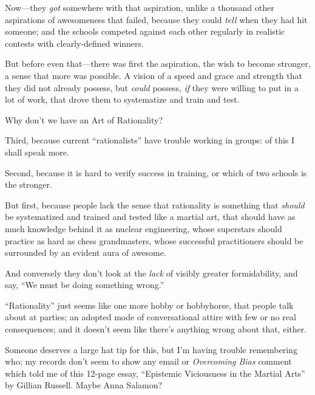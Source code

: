 {
 Now---they \textit{got} somewhere with that aspiration, unlike a
thousand other aspirations of awesomeness that failed, because they
could \textit{tell} when they had hit someone; and the schools competed
against each other regularly in realistic contests with clearly-defined
winners.}

{
 But before even that---there was first the aspiration, the wish to
become stronger, a sense that more was possible. A vision of a speed
and grace and strength that they did not already possess, but
\textit{could} possess, \textit{if} they were willing to put in a lot
of work, that drove them to systematize and train and test.}

{
 Why don't we have an Art of Rationality?}

{
 Third, because current
``rationalists'' have trouble
working in groups: of this I shall speak more.}

{
 Second, because it is hard to verify success in training, or which
of two schools is the stronger.}

{
 But first, because people lack the sense that rationality is
something that \textit{should} be systematized and trained and tested
like a martial art, that should have as much knowledge behind it as
nuclear engineering, whose superstars should practice as hard as chess
grandmasters, whose successful practitioners should be surrounded by an
evident aura of awesome.}

{
 And conversely they don't look at the
\textit{lack} of visibly greater formidability, and say,
``We must be doing something
wrong.''}

{
 ``Rationality'' just seems like
one more hobby or hobbyhorse, that people talk about at parties; an
adopted mode of conversational attire with few or no real consequences;
and it doesn't seem like there's
anything wrong about that, either.}

\myendsectiontext


{
 Someone deserves a large hat tip for this, but I'm
having trouble remembering who; my records don't seem
to show any email or \textit{Overcoming Bias} comment which told me of
this 12-page essay, ``Epistemic Viciousness in the
Martial Arts'' by Gillian Russell.
Maybe Anna Salamon?}

